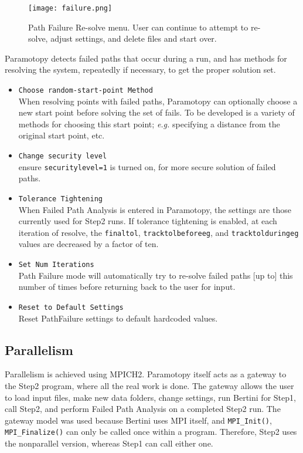 \begin{figure}[h]
\begin{center}
\texttt{[image: failure.png]}
\caption[Path Failure Re-solve Menu]{Path Failure Re-solve menu.  User can continue to attempt to re-solve, adjust settings, and delete files and start over.}
\label{screen:failure}
\end{center}
\end{figure}

Paramotopy detects failed paths that occur during a run, and has methods for resolving the system, repeatedly if necessary, to get the proper solution set. 

\begin{itemize}
	\item \texttt{Choose random-start-point Method} \\ When resolving points with failed paths, Paramotopy can optionally choose a new start point before solving the set of fails.  To be developed is a variety of methods for choosing this start point; {\em e.g.} specifying a distance from the original start point, etc.
	\item \texttt{Change security level} \\ ensure \texttt{securitylevel=1} is turned on, for more secure solution of failed paths.
	\item \texttt{Tolerance Tightening} \\ When Failed Path Analysis is entered in Paramotopy, the settings are those currently used for Step2 runs.  If tolerance tightening is enabled, at each iteration of resolve, the \texttt{finaltol}, \texttt{tracktolbeforeeg}, and \texttt{tracktolduringeg} values are decreased by a factor of ten.  
	\item \texttt{Set Num Iterations}  \\ Path Failure mode will automatically try  to re-solve failed paths [up to] this number of times before returning back to the user for input.
	\item \texttt{Reset to Default Settings} \\ Reset PathFailure settings to default hardcoded values.
\end{itemize}

\clearpage






\subsection{Parallelism}
Parallelism is achieved using MPICH2.  Paramotopy itself acts as a gateway to the Step2 program, where all the real work is done.  The gateway allows the user to load input files, make new data folders, change settings, run Bertini for Step1, call Step2, and perform Failed Path Analysis on a completed Step2 run.  The gateway model was used because Bertini uses MPI itself, and \texttt{MPI\_Init()}, \texttt{MPI\_Finalize()} can only be called once within a program.  Therefore, Step2 uses the nonparallel version, whereas Step1 can call either one.

